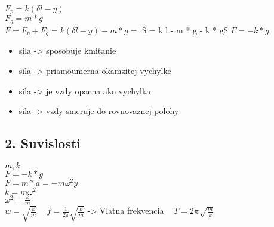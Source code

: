 \documentclass[
]{article}
\providecommand{\tightlist}{%
  \setlength{\itemsep}{0pt}\setlength{\parskip}{0pt}}
\begin{document}
\(F_p = k (\delta l - y)\)\\
\(F_g = m * g\)\\
\(F = F_p + F_g = k(\delta l - y) - m * g =\) \$ = k \delta l - m * g -
k * g\$ \(F = - k * g\)

\begin{itemize}
\tightlist
\item
  sila -\textgreater{} sposobuje kmitanie
\item
  sila -\textgreater{} priamoumerna okamzitej vychylke
\item
  sila -\textgreater{} je vzdy opacna ako vychylka
\item
  sila -\textgreater{} vzdy smeruje do rovnovaznej polohy
\end{itemize}

\hypertarget{suvislosti}{%
\subsection{2. Suvislosti}\label{suvislosti}}

\(m, k\)\\
\(F = - k * g\)\\
\(F = m * a = - m \omega^2 y\)\\
\(k = m \omega^2\)\\
\(\omega^2 = \frac{k}{m}\)\\
\(w = \sqrt{\frac{k}{m}}\) ~ \(f = \frac{1}{2 \pi} \sqrt{\frac{k}{m}}\)
-\textgreater{} Vlatna frekvencia ~ \(T = 2 \pi \sqrt{\frac{m}{k}}\) ~
\end{document}
